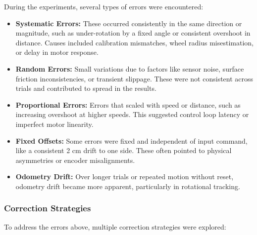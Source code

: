 \documentclass[a4paper, 12pt]{article}
\begin{document}
    During the experiments, several types of errors were encountered:

    \begin{itemize}
        \item \textbf{Systematic Errors:} These occurred consistently in the same direction or magnitude, such as under-rotation by a fixed angle or consistent overshoot in distance. Causes included calibration mismatches, wheel radius misestimation, or delay in motor response.
        
        \item \textbf{Random Errors:} Small variations due to factors like sensor noise, surface friction inconsistencies, or transient slippage. These were not consistent across trials and contributed to spread in the results.

        \item \textbf{Proportional Errors:} Errors that scaled with speed or distance, such as increasing overshoot at higher speeds. This suggested control loop latency or imperfect motor linearity.

        \item \textbf{Fixed Offsets:} Some errors were fixed and independent of input command, like a consistent 2 cm drift to one side. These often pointed to physical asymmetries or encoder misalignments.

        \item \textbf{Odometry Drift:} Over longer trials or repeated motion without reset, odometry drift became more apparent, particularly in rotational tracking.
    \end{itemize}

    \subsubsection*{Correction Strategies}

    To address the errors above, multiple correction strategies were explored:
\end{document}
